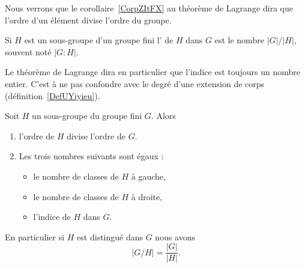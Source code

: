 Nous verrons que le corollaire~\ref{CorpZItFX} au théorème de Lagrange dira que l'ordre d'un élément divise l'ordre du groupe.



\begin{definition}      \label{DEFooMPIAooIeZNaR}
    Si \( H\) est un sous-groupe d'un groupe fini l' de \( H\) dans \( G\) est le nombre \( | G |/| H |\), souvent noté \( | G:H |\).
\end{definition}

Le théorème de Lagrange dira en particulier que l'indice est toujours un nombre entier. C'est à ne pas confondre avec le degré d'une extension de corps (définition~\ref{DefUYiyieu}).


\begin{theorem}    \label{ThoLagrange}
    Soit \( H\) un sous-groupe du groupe fini \( G\).  Alors
    \begin{enumerate}
        \item   \label{ITEMooDPKSooNpOusd}
    l'ordre de \( H\) divise l'ordre de \( G\).
\item
    Les trois nombres suivants sont égaux :
    \begin{itemize}
        \item
            le nombre de classes de \( H\) à gauche,
        \item
            le nombre de classes de \( H\) à droite,
        \item
            l'indice de \( H\) dans \( G\).
    \end{itemize}
    \end{enumerate}
    En particulier si \( H\) est distingué dans \( G\) nous avons
    \begin{equation}
        | G/H |=\frac{ | G | }{ | H | }.
    \end{equation}
\end{theorem}

